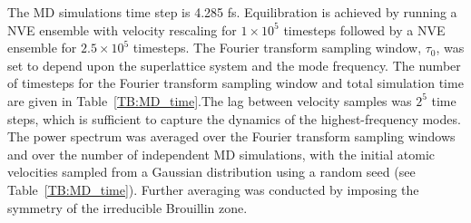 \begin{comment}
By taking the Fourier transform of the autocorrelation of Eq. (\ref{EQ:NMD:qdot}), the mode power spectrum is obtained: \cite{dove_introduction_1993-3}
\begin{equation}\label{EQ:NMD:SED}
\begin{split}
T\kvw=&\lim_{\tau_0\rightarrow\infty}\frac{1}{2\tau_0}\left|\frac{1}{\sqrt{2\pi}}\int_{0}^{\tau_0}\dot{q}\kvt\exp(-i\omega t)dt\right|^2.
\end{split}
\end{equation}
\end{comment}
The MD simulations time step is 4.285 fs. Equilibration is achieved by running a NVE ensemble with velocity rescaling for $1\times 10^5$ timesteps followed by a NVE ensemble for $2.5 \times10^5$ timesteps. The Fourier transform sampling window, $\tau_0$, was set to depend upon the superlattice system and the mode frequency. The number of timesteps for the Fourier transform sampling window and total simulation time are given in Table~\ref{TB:MD_time}.The lag between velocity samples was $2^5$ time steps, which is sufficient to capture the dynamics of the highest-frequency modes. The power spectrum was averaged over the Fourier transform sampling windows and over the number of independent MD simulations, with the initial atomic velocities sampled from a Gaussian distribution using a random seed (see Table~\ref{TB:MD_time}). Further averaging was conducted by imposing the symmetry of the irreducible Brouillin zone. 


